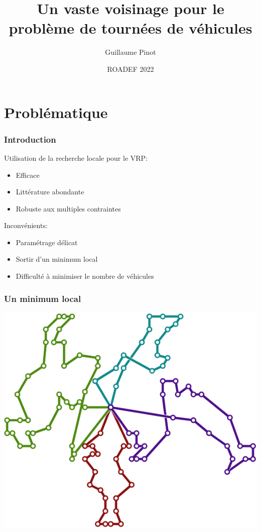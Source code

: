 \documentclass[table]{beamer}
\title[Un vaste voisinage pour les tournées de véhicules]{Un vaste voisinage pour le problème de tournées de véhicules}
\author{Guillaume Pinot}
\institute%
{ Kardinal, Paris, France }
\date{ROADEF 2022}
\begin{document}
\begin{frame}
  \titlepage
\end{frame}


\section{Problématique}

\begin{frame}
  \frametitle{Introduction}

  Utilisation de la recherche locale pour le VRP:
  \begin{itemize}
  \item Efficace
  \item Littérature abondante
  \item Robuste aux multiples contraintes
  \end{itemize}

  Inconvénients:
  \begin{itemize}
  \item Paramétrage délicat
  \item Sortir d'un minimum local
  \item Difficulté à minimiser le nombre de véhicules
  \end{itemize}
\end{frame}

\begin{frame}
  \frametitle{Un minimum local}

  \centering
  \includegraphics[width=0.7\linewidth]{../article/images/C203-2}
\end{frame}
\end{document}
